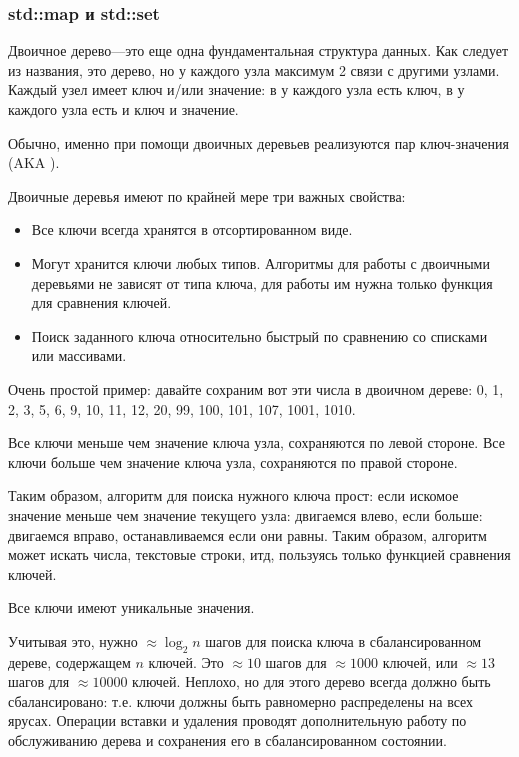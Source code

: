 \subsubsection{std::map и std::set}

Двоичное дерево---это еще одна фундаментальная структура данных.
Как следует из названия, это дерево, но у каждого узла максимум 2 связи с другими узлами.
Каждый узел имеет ключ и/или значение:
в  у каждого узла есть ключ,
в  у каждого узла есть и ключ и значение.

Обычно, именно при помощи двоичных деревьев реализуются  пар ключ-значения 
(\ac{AKA} ).

Двоичные деревья имеют по крайней мере три важных свойства:

\begin{itemize}
\item Все ключи всегда хранятся в отсортированном виде.
\item Могут хранится ключи любых типов.
Алгоритмы для работы с двоичными деревьями не зависят от типа ключа,
для работы им нужна только функция для сравнения ключей.
\item Поиск заданного ключа относительно быстрый по сравнению со списками или массивами.
\end{itemize}

Очень простой пример: давайте сохраним вот эти числа в двоичном дереве:
0, 1, 2, 3, 5, 6, 9, 10, 11, 12, 20, 99, 100, 101, 107, 1001, 1010.



Все ключи меньше чем значение ключа узла, сохраняются по левой стороне.
Все ключи больше чем значение ключа узла, сохраняются по правой стороне.

Таким образом, алгоритм для поиска нужного ключа прост: если искомое значение меньше чем значение текущего узла:
двигаемся влево, если больше: двигаемся вправо, останавливаемся если они равны.
Таким образом, алгоритм может искать числа, текстовые строки, итд, 
пользуясь только функцией сравнения ключей.

Все ключи имеют уникальные значения.

Учитывая это, нужно $\approx \log_{2} n$ шагов для поиска ключа 
в сбалансированном дереве, содержащем $n$ ключей.
Это $\approx 10$ шагов для $\approx 1000$ ключей, или $\approx 13$ 
шагов для $\approx 10000$ ключей.
Неплохо, но для этого дерево всегда должно быть сбалансировано: т.е. ключи должны быть равномерно распределены
на всех ярусах.
Операции вставки и удаления проводят дополнительную работу по обслуживанию дерева и сохранения его в сбалансированном
состоянии.

